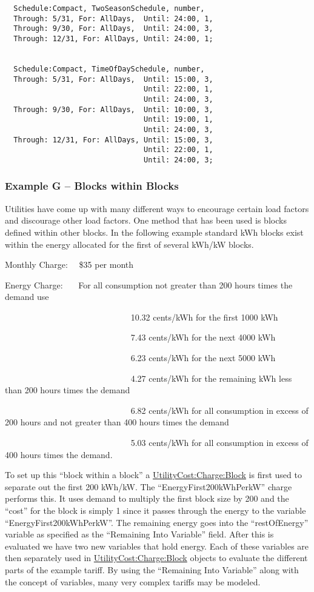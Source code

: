 \begin{lstlisting}
  Schedule:Compact, TwoSeasonSchedule, number,
  Through: 5/31, For: AllDays,  Until: 24:00, 1,
  Through: 9/30, For: AllDays,  Until: 24:00, 3,
  Through: 12/31, For: AllDays, Until: 24:00, 1;


  Schedule:Compact, TimeOfDaySchedule, number,
  Through: 5/31, For: AllDays,  Until: 15:00, 3,
                                Until: 22:00, 1,
                                Until: 24:00, 3,
  Through: 9/30, For: AllDays,  Until: 10:00, 3,
                                Until: 19:00, 1,
                                Until: 24:00, 3,
  Through: 12/31, For: AllDays, Until: 15:00, 3,
                                Until: 22:00, 1,
                                Until: 24:00, 3;
\end{lstlisting}

\subsubsection{Example G -- Blocks within Blocks}\label{example-g-blocks-within-blocks}

Utilities have come up with many different ways to encourage certain load factors and discourage other load factors. One method that has been used is blocks defined within other blocks. In the following example standard kWh blocks exist within the energy allocated for the first of several kWh/kW blocks.

Monthly Charge:~~ \$35 per month

Energy Charge:~~~ For all consumption not greater than 200 hours times the demand use

~~~~~~~~~~~~~~~~~~~~~~~~~~~~~ 10.32 cents/kWh for the first 1000 kWh

~~~~~~~~~~~~~~~~~~~~~~~~~~~~~ 7.43 cents/kWh for the next 4000 kWh

~~~~~~~~~~~~~~~~~~~~~~~~~~~~~ 6.23 cents/kWh for the next 5000 kWh

~~~~~~~~~~~~~~~~~~~~~~~~~~~~~ 4.27 cents/kWh for the remaining kWh less than 200 hours times the demand

~~~~~~~~~~~~~~~~~~~~~~~~~~~~~ 6.82 cents/kWh for all consumption in excess of 200 hours and not greater than 400 hours times the demand

~~~~~~~~~~~~~~~~~~~~~~~~~~~~~ 5.03 cents/kWh for all consumption in excess of 400 hours times the demand.

To set up this ``block within a block'' a \hyperref[utilitycostchargeblock]{UtilityCost:Charge:Block} is first used to separate out the first 200 kWh/kW. The ``EnergyFirst200kWhPerkW'' charge performs this. It uses demand to multiply the first block size by 200 and the ``cost'' for the block is simply 1 since it passes through the energy to the variable ``EnergyFirst200kWhPerkW''. The remaining energy goes into the ``restOfEnergy'' variable as specified as the ``Remaining Into Variable'' field. After this is evaluated we have two new variables that hold energy. Each of these variables are then separately used in \hyperref[utilitycostchargeblock]{UtilityCost:Charge:Block} objects to evaluate the different parts of the example tariff. By using the ``Remaining Into Variable'' along with the concept of variables, many very complex tariffs may be modeled.


